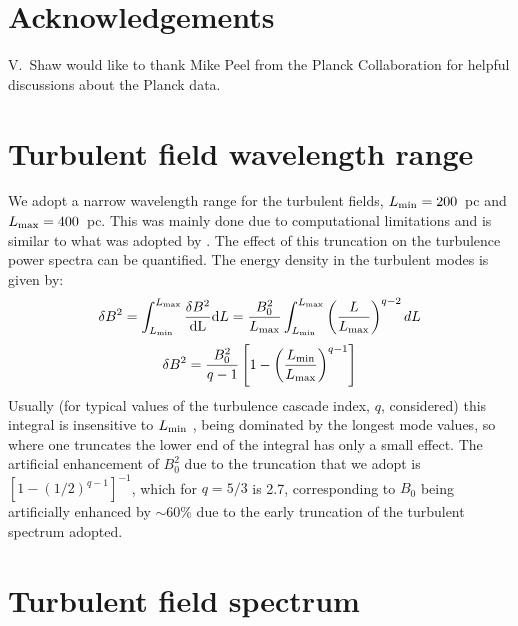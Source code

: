 \documentclass[usenatbib]{mnras}
\begin{document}
\section*{Acknowledgements}
V.~Shaw would like to thank Mike Peel from the Planck Collaboration for helpful discussions about the Planck data.




\appendix

\section{Turbulent field wavelength range}

\label{Appendix_A}
We adopt a narrow wavelength range for the turbulent fields, $L_{\rm min}=200$~pc and $L_{\rm max}=400$~pc. This was mainly done due to computational limitations and is similar to what was adopted by \cite{West_Helicity}. The effect of this truncation on the turbulence power spectra can be quantified. The energy density in the turbulent modes is given by:
\begin{equation}
    \delta B^{2} = \int _{L_{\rm min}}^{L_{\rm max}} \frac{\delta B^{2}}{\rm{d}L}{\rm{d}}L = \frac{B_{0}^{2}}{L_{\rm max}}\int  _{L_{\rm min}}^{L_{\rm max}}\left(\frac{L}{L_{\rm max}}\right)^{q-2} dL
\end{equation}
\begin{equation}
  \delta B^{2}  =\frac{B_{0}^{2}}{q-1}\left[1-\left(\frac{L_{\rm min}}{L_{\rm max}}\right)^{q-1}\right] 
\end{equation}
Usually (for typical values of the turbulence cascade index, $q$,
considered) this integral is insensitive to $L_{\rm min}$ , being dominated by the longest mode values, so where one truncates the lower end of the integral has only a small effect. The artificial enhancement of $B_0^2$ due to the truncation that we adopt is $\left[1-(1/2)^{q-1}\right]^{-1}$, which for $q=5/3$ is 2.7, corresponding to $B_0$ being artificially enhanced by $\sim $60\% due to the early truncation of the turbulent spectrum adopted.


\section{Turbulent field spectrum}
\end{document}
